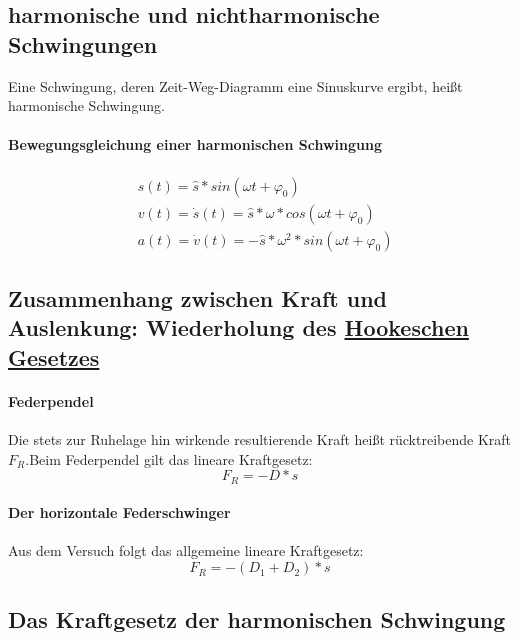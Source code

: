 \documentclass[12 pt]{article}
\numberwithin{equation}{section}
\begin{document}
	\subsection{harmonische und nichtharmonische Schwingungen}
	Eine Schwingung, deren Zeit-Weg-Diagramm eine Sinuskurve ergibt, heißt harmonische Schwingung.
	\paragraph{Bewegungsgleichung einer harmonischen Schwingung}
	\begin{align*}
	&s(t)=\hat{s}*sin(\omega t+\varphi_{0})\\
	&v(t)=\dot{s}(t)=\hat{s}*\omega*cos(\omega t+\varphi_{0})\\
	&a(t)=\dot{v}(t)=-\hat{s}*\omega^{2}*sin(\omega t+\varphi_{0})
	\end{align*}

	\subsection{Zusammenhang zwischen Kraft und Auslenkung: Wiederholung des \underline{Hookeschen Gesetzes}}
	\paragraph{Federpendel}
	Die stets zur Ruhelage hin wirkende resultierende Kraft heißt rücktreibende Kraft$F_R$.\newline Beim Federpendel gilt das lineare Kraftgesetz:
	\begin{equation*}
		F_{R}=-D*s
	\end{equation*}
	\paragraph{Der horizontale Federschwinger}
	Aus dem Versuch folgt das allgemeine lineare Kraftgesetz:
	\begin{equation*}
		F_{R}=-(D_1+D_2)*s
	\end{equation*}
	
	\subsection{Das Kraftgesetz der harmonischen Schwingung}
\end{document}
